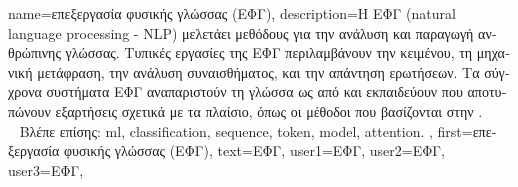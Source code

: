 {name={\foreignlanguage{greek}{επεξεργασία φυσικής γλώσσας (ΕΦΓ)}},
	description={\foreignlanguage{greek}{Η ΕΦΓ} (natural language processing - NLP)
 		\foreignlanguage{greek}{μελετάει μεθόδους}  \foreignlanguage{greek}{για την ανάλυση και παραγωγή ανθρώπινης γλώσσας.} 
  		\foreignlanguage{greek}{Τυπικές εργασίες της ΕΦΓ περιλαμβάνουν την}  \foreignlanguage{greek}{κειμένου, 
		τη μηχανική μετάφραση, την ανάλυση συναισθήματος, και την απάντηση ερωτήσεων. Τα σύγχρονα συστήματα ΕΦΓ αναπαριστούν τη 
		γλώσσα ως}  \foreignlanguage{greek}{από}  \foreignlanguage{greek}{και εκπαι\-δεύ\-ουν}  
		 \foreignlanguage{greek}{που αποτυπώνουν εξαρτήσεις σχετικά με τα πλαίσιο, όπως οι μέθοδοι που βασίζονται στην} 
		.
		\\ 
 		\foreignlanguage{greek}{Βλέπε επίσης:} \gls{ml}, \gls{classification}, \gls{sequence}, \gls{token}, \gls{model}, \gls{attention}. }, 
	first={\foreignlanguage{greek}{επεξεργασία φυσικής γλώσσας (ΕΦΓ)}}, 
	text={\foreignlanguage{greek}{ΕΦΓ}},
	user1={\foreignlanguage{greek}{ΕΦΓ}}, %
  	user2={\foreignlanguage{greek}{ΕΦΓ}}, %
	user3={\foreignlanguage{greek}{ΕΦΓ}}, %
}

